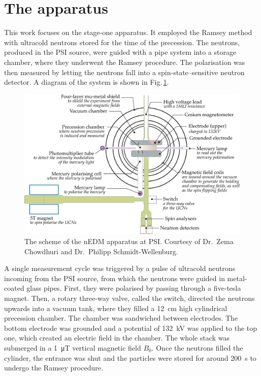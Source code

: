 \section{The apparatus}
This work focuses on the stage-one apparatus.
It employed the Ramsey method with ultracold neutrons stored for the time of the precession.
The neutrons, produced in the PSI source, were guided with a pipe system into a storage chamber, where they underwent the Ramsey procedure.
The polarisation was then measured by letting the neutrons fall into a spin-state--sensitive neutron detector.
A diagram of the system is shown in Fig.\,\ref{fig:nEDM_scheme}.

\begin{figure}
  \centering
  \includegraphics[width=\linewidth]{gfx/nEDMatPSI/apparatus_palatino.pdf}
  \caption{The scheme of the nEDM apparatus at PSI\@. Courtesy of Dr.\ Zema Chowdhuri and Dr.\ Philipp Schmidt-Wellenburg.}\label{fig:nEDM_scheme}
\end{figure}

A single measurement cycle was triggered by a pulse of ultracold neutrons incoming from the PSI source, from which the neutrons were guided in metal-coated glass pipes.
First, they were polarised by passing through a five-tesla magnet.
Then, a rotary three-way valve, called the switch, directed the neutrons upwards into a vacuum tank, where they filled a \SI{12}{\centi\meter} high cylindrical precession chamber.
The chamber was sandwiched between electrodes. The bottom electrode was grounded and a potential of \SI{132}{\kilo\volt} was applied to the top one, which created an electric field in the chamber.
The whole stack was submerged in a \SI{1}{\micro\tesla} vertical magnetic field $B_0$.
Once the neutrons filled the cylinder, the entrance was shut and the particles were stored for around \SI{200}{\second} to undergo the Ramsey procedure.


